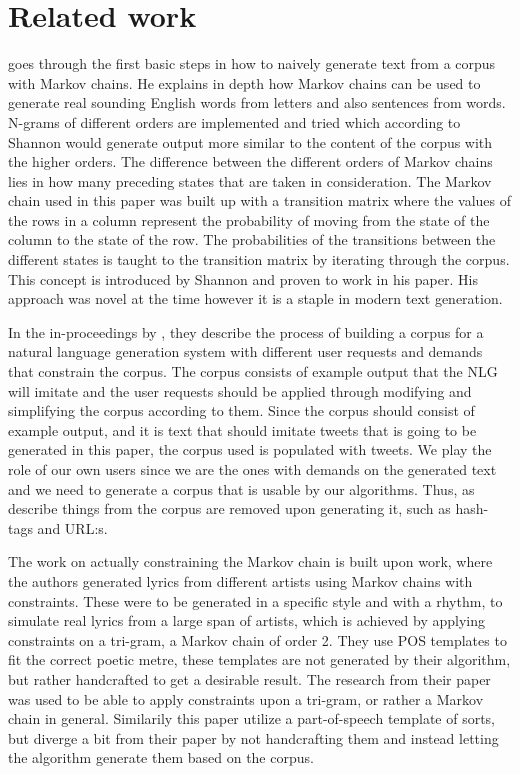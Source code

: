 \documentclass[a4paper,12pt]{article}
\begin{document}
\section{Related work}
\label{sec:relwork}
\cite{shannon48} goes through the first basic steps in how to naively generate text from a corpus with Markov chains. 
He explains in depth how Markov chains can be used to generate real sounding English words from letters and also sentences from words. 
N-grams of different orders are implemented and tried which according to Shannon would generate output more similar to the content of the corpus with the higher orders. 
The difference between the different orders of Markov chains lies in how many preceding states that are taken in consideration.
The Markov chain used in this paper was built up with a transition matrix where the values of the rows in a column represent the probability of moving from the state of the column to the state of the row. The probabilities of the transitions between the different states is taught to the transition matrix by iterating through the corpus. This concept is introduced by Shannon and proven to work in his paper.
His approach was novel at the time however it is a staple in modern text generation. 


In the in-proceedings by \cite{Corpus}, they describe the process of building a corpus for a natural language generation system with different user requests and demands that constrain the corpus. 
The corpus consists of example output that the NLG will imitate and the user requests should be applied through modifying and simplifying the corpus according to them.
Since the corpus should consist of example output, and it is text that should imitate tweets that is going to be generated in this paper, the corpus used is populated with tweets.
We play the role of our own users since we are the ones with demands on the generated text and we need to generate a corpus that is usable by our algorithms. Thus, as \citep{Corpus} describe things from the corpus are removed upon generating it, such as hash-tags and URL:s.


The work on actually constraining the Markov chain is built upon \cite{McBarb} work, 
where the authors generated lyrics from different artists using Markov chains with constraints. 
These were to be generated in a specific style and with a rhythm, to simulate real lyrics from a large span of artists, which is achieved by applying constraints on a tri-gram, a Markov chain of order 2.
They use POS templates to fit the correct poetic metre, these templates are not generated by their algorithm, but rather handcrafted to get a desirable result.
The research from their paper was used to be able to apply constraints upon a tri-gram, or rather a Markov chain in general. Similarily this paper utilize a part-of-speech template of sorts, but diverge a bit from their paper by not handcrafting them and instead letting the algorithm generate them based on the corpus.
\end{document}
